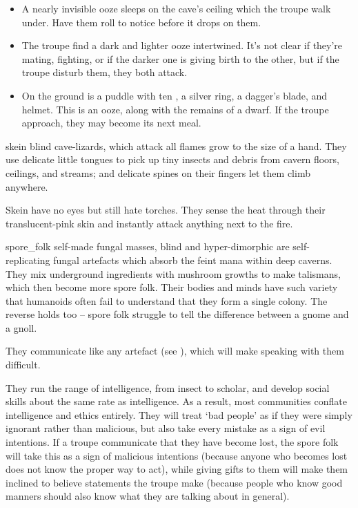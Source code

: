 \begin{multicols}{2}
\showEnc

\begin{itemize}
  \item
  A nearly invisible ooze sleeps on the cave's ceiling which the troupe walk under.
  Have them roll  to notice before it drops on them.
  \item
  The troupe find a dark and lighter ooze intertwined.
  It's not clear if they're mating, fighting, or if the darker one is giving birth to the other, but if the troupe disturb them, they both attack.
  \item
  On the ground is a puddle with ten , a silver ring, a dagger's blade, and helmet.
  This is an ooze, along with the remains of a dwarf.
  If the troupe approach, they may become its next meal.
\end{itemize}

\jelly

  {skein}%
  {blind cave-lizards, which attack all flames}%
grow to the size of a hand.
They use delicate little tongues to pick up tiny insects and debris from cavern floors, ceilings, and streams; and delicate spines on their fingers let them climb anywhere.

Skein have no eyes but still hate torches.
They sense the heat through their translucent-pink skin and instantly attack anything next to the fire.

\skeinSwarm

  {spore_folk}%
  {self-made fungal masses, blind and hyper-dimorphic}%
are self-replicating fungal \glspl{artefact} which absorb the feint mana within deep caverns.
They mix underground \glspl{ingredient} with mushroom growths to make \glspl{talisman}, which then become more spore folk.
Their bodies and minds have such variety that humanoids often fail to understand that they form a single colony.
The reverse holds too -- spore folk struggle to tell the difference between a gnome and a gnoll.

They communicate like any \gls{artefact} (see ), which will make speaking with them difficult.

They run the range of intelligence, from insect to scholar, and develop social skills about the same rate as intelligence.
As a result, most communities conflate intelligence and ethics entirely.
They will treat `bad people' as if they were simply ignorant rather than malicious, but also take every mistake as a sign of evil intentions.
If a troupe communicate that they have become lost, the spore folk will take this as a sign of malicious intentions (because anyone who becomes lost does not know the proper way to act), while giving gifts to them will make them inclined to believe statements the troupe make (because people who know good manners should also know what they are talking about in general).


\end{multicols}
